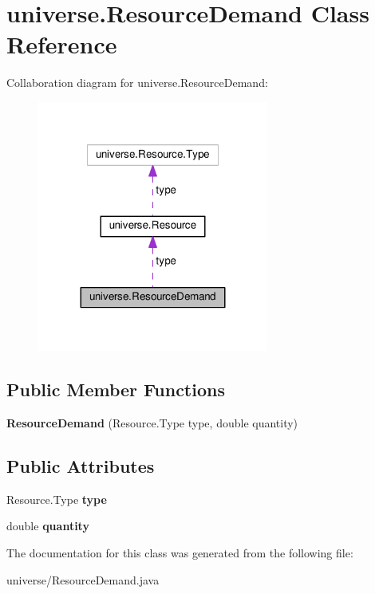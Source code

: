 \hypertarget{classuniverse_1_1_resource_demand}{}\section{universe.\+Resource\+Demand Class Reference}
\label{classuniverse_1_1_resource_demand}


Collaboration diagram for universe.\+Resource\+Demand\+:\nopagebreak
\begin{figure}[H]
\begin{center}
\leavevmode
\includegraphics[width=215pt]{classuniverse_1_1_resource_demand__coll__graph}
\end{center}
\end{figure}
\subsection*{Public Member Functions}
\begin{DoxyCompactItemize}
\item 
{\bfseries Resource\+Demand} (Resource.\+Type type, double quantity)\hypertarget{classuniverse_1_1_resource_demand_ad40b7c8a29572e5c19436b2bdb8e8c59}{}\label{classuniverse_1_1_resource_demand_ad40b7c8a29572e5c19436b2bdb8e8c59}

\end{DoxyCompactItemize}
\subsection*{Public Attributes}
\begin{DoxyCompactItemize}
\item 
Resource.\+Type {\bfseries type}\hypertarget{classuniverse_1_1_resource_demand_a865663018bb20388bcea6e0ba1eebc6e}{}\label{classuniverse_1_1_resource_demand_a865663018bb20388bcea6e0ba1eebc6e}

\item 
double {\bfseries quantity}\hypertarget{classuniverse_1_1_resource_demand_a0f0b49718e540f049c92eb48211698ba}{}\label{classuniverse_1_1_resource_demand_a0f0b49718e540f049c92eb48211698ba}

\end{DoxyCompactItemize}


The documentation for this class was generated from the following file\+:\begin{DoxyCompactItemize}
\item 
universe/Resource\+Demand.\+java\end{DoxyCompactItemize}
